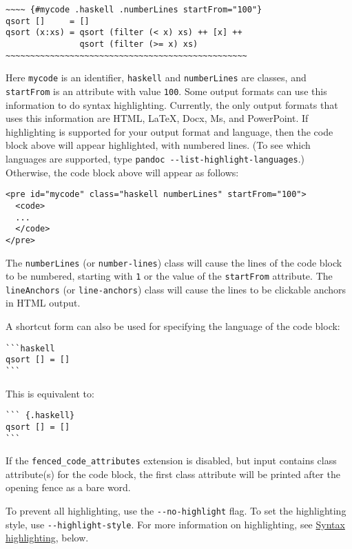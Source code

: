 \documentclass[]{article}
\begin{document}
\begin{verbatim}
~~~~ {#mycode .haskell .numberLines startFrom="100"}
qsort []     = []
qsort (x:xs) = qsort (filter (< x) xs) ++ [x] ++
               qsort (filter (>= x) xs)
~~~~~~~~~~~~~~~~~~~~~~~~~~~~~~~~~~~~~~~~~~~~~~~~~
\end{verbatim}

Here \texttt{mycode} is an identifier, \texttt{haskell} and
\texttt{numberLines} are classes, and \texttt{startFrom} is an attribute
with value \texttt{100}. Some output formats can use this information to
do syntax highlighting. Currently, the only output formats that uses
this information are HTML, LaTeX, Docx, Ms, and PowerPoint. If
highlighting is supported for your output format and language, then the
code block above will appear highlighted, with numbered lines. (To see
which languages are supported, type
\texttt{pandoc\ -\/-list-highlight-languages}.) Otherwise, the code
block above will appear as follows:

\begin{verbatim}
<pre id="mycode" class="haskell numberLines" startFrom="100">
  <code>
  ...
  </code>
</pre>
\end{verbatim}

The \texttt{numberLines} (or \texttt{number-lines}) class will cause the
lines of the code block to be numbered, starting with \texttt{1} or the
value of the \texttt{startFrom} attribute. The \texttt{lineAnchors} (or
\texttt{line-anchors}) class will cause the lines to be clickable
anchors in HTML output.

A shortcut form can also be used for specifying the language of the code
block:

\begin{verbatim}
```haskell
qsort [] = []
```
\end{verbatim}

This is equivalent to:

\begin{verbatim}
``` {.haskell}
qsort [] = []
```
\end{verbatim}

If the \texttt{fenced\_code\_attributes} extension is disabled, but
input contains class attribute(s) for the code block, the first class
attribute will be printed after the opening fence as a bare word.

To prevent all highlighting, use the \texttt{-\/-no-highlight} flag. To
set the highlighting style, use \texttt{-\/-highlight-style}. For more
information on highlighting, see
\protect\hyperlink{syntax-highlighting}{Syntax highlighting}, below.
\end{document}
